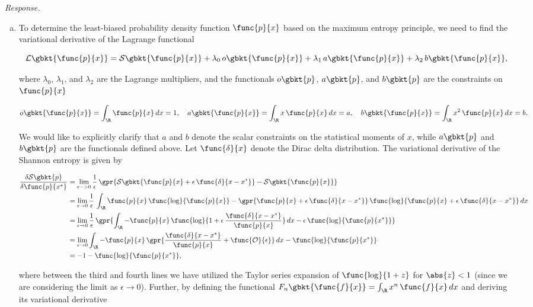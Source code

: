 \textit{Response.}

\begin{enumerate}[(a)]

	\item To determine the least-biased probability density function $\func{p}{x}$ based on the maximum entropy principle, we need to find the variational derivative of the Lagrange functional
	
	$$\mathcal{L}\gbkt{\func{p}{x}} = \mathcal{S}\gbkt{\func{p}{x}} + \lambda_0\,o\gbkt{\func{p}{x}} + \lambda_1\,a\gbkt{\func{p}{x}} + \lambda_2\,b\gbkt{\func{p}{x}},$$
	
	where $\lambda_0$, $\lambda_1$, and $\lambda_2$ are the Lagrange multipliers, and the functionals $o\gbkt{p}$, $a\gbkt{p}$, and $b\gbkt{p}$ are the constraints on $\func{p}{x}$
	
	$$o\gbkt{\func{p}{x}} = \int_{\R} \func{p}{x}\,dx = 1,\quad a\gbkt{\func{p}{x}} = \int_{\R} x\,\func{p}{x}\,dx = a,\quad b\gbkt{\func{p}{x}} = \int_{\R} x^2\,\func{p}{x}\,dx = b.$$
	
	We would like to explicitly clarify that $a$ and $b$ denote the scalar constraints on the statistical moments of $x$, while $a\gbkt{p}$ and $b\gbkt{p}$ are the functionals defined above. Let $\func{\delta}{x}$ denote the Dirac delta distribution. The variational derivative of the Shannon entropy is given by
	
	\begin{align*}	
	\frac{\delta\mathcal{S}\gbkt{p}}{\delta\func{p}{x^*}} &= \lim_{\epsilon -> 0} \frac{1}{\epsilon}\,\gpr{\mathcal{S}\gbkt{\func{p}{x} + \epsilon\,\func{\delta}{x - x^{*}}} - \mathcal{S}\gbkt{\func{p}{x}}} \\
	&= \lim_{\epsilon \to 0} \frac{1}{\epsilon}\,\int_{\R} \func{p}{x}\,\func{\log}{\func{p}{x}} - \gpr{\func{p}{x} + \epsilon\,\func{\delta}{x - x^{*}}}\,\func{\log}{\func{p}{x} + \epsilon\,\func{\delta}{x - x^{*}}}\,dx \\
	&= \lim_{\epsilon \to 0} \frac{1}{\epsilon}\,\gpr{\int_{\R} -\func{p}{x}\,\func{\log}{1 + \epsilon\,\frac{\func{\delta}{x - x^{*}}}{\func{p}{x}}}\,dx - \epsilon\,\func{\log}{\func{p}{x^{*}}}} \\
	&= \lim_{\epsilon \to 0} \int_{\R} -\func{p}{x}\,\gpr{\frac{\func{\delta}{x - x^{*}}}{\func{p}{x}} + \func{\mathcal{O}}{\epsilon}}\,dx - \func{\log}{\func{p}{x^{*}}} \\
	&= -1 - \func{\log}{\func{p}{x^{*}}},
	\end{align*}
	
	where between the third and fourth lines we have utilized the Taylor series expansion of $\func{\log}{1 + z}$ for $\abs{z} < 1$ (since we are considering the limit as $\epsilon \to 0$). Further, by defining the functional $F_n\gbkt{\func{f}{x}} = \int_{\R} x^n\,\func{f}{x}\,dx$ and deriving its variational derivative
	

\end{enumerate}
